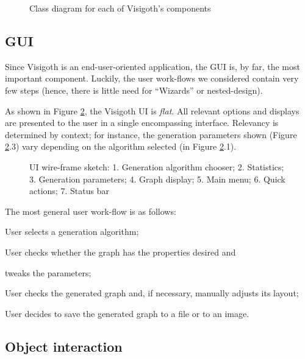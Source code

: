 \documentclass[a4paper,11pt,titlepage]{article}
\begin{document}
\begin{figure}[ht]
  \centering
  
  \caption{Class diagram for each of Visigoth's components}
  \label{fig:classes}
\end{figure}

\subsection{GUI}
\label{gui}

Since Visigoth is an end-user-oriented application, the GUI is, by
far, the most important component. Luckily, the user work-flows we
considered contain very few steps (hence, there is little need for
``Wizards'' or nested-design).

As shown in Figure \ref{fig:gui-sketch}, the Visigoth UI is
\emph{flat}. All relevant options and displays are presented to the
user in a single encompassing interface. Relevancy is determined by
context; for instance, the generation parameters shown (Figure
\ref{fig:gui-sketch}.3) vary depending on the algorithm selected (in
Figure \ref{fig:gui-sketch}.1).

\begin{figure}[h]
  \centering
  
  \caption{UI wire-frame sketch: 1. Generation algorithm chooser;
    2. Statistics; 3. Generation parameters; 4. Graph display; 5. Main
    menu; 6. Quick actions; 7. Status bar}
  \label{fig:gui-sketch}
\end{figure}

\noindent The most general user work-flow is as follows:
\begin{description}
  \setlength{\itemindent}{\parindent}
  \item [Figure \ref{fig:gui-sketch}.1] User selects a generation
    algorithm;
  \item [Figure \ref{fig:gui-sketch}.2] User checks whether the graph
    has the properties desired and
  \item [Figure \ref{fig:gui-sketch}.3] tweaks the parameters;
  \item [Figure \ref{fig:gui-sketch}.4] User checks the generated
    graph and, if necessary, manually adjusts its layout;
  \item [Figure \ref{fig:gui-sketch}.5, 6] User decides to save the
    generated graph to a file or to an image.
\end{description}

\subsection{Object interaction}
\label{interaction}
\end{document}
